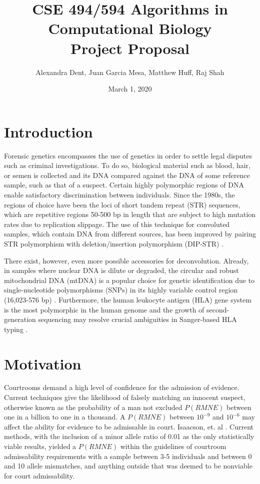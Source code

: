 \documentclass[10pt]{article}
\title{CSE 494/594 Algorithms in Computational Biology \\
		Project Proposal}
\author{Alexandra Dent, Juan Garcia Mesa, Matthew Huff, Raj Shah}
\date{March 1, 2020}
\begin{document}
\maketitle

\section{Introduction}
Forensic genetics encompasses the use of genetics in order to settle legal disputes such as criminal investigations. To do so, biological material such as blood, hair, or semen is collected and its DNA compared against the DNA of some reference sample, such as that of a suspect. Certain highly polymorphic regions of DNA enable satisfactory discrimination between individuals. Since the 1980s, the regions of choice have been the loci of short tandem repeat (STR) sequences, which are repetitive regions 50-500 bp in length that are subject to high mutation rates due to replication slippage. The use of this technique for convoluted samples, which contain DNA from different sources, has been improved by pairing STR polymorphism with deletion/insertion polymorphism (DIP-STR) \cite{Carracedo2000}.

There exist, however, even more possible accessories for deconvolution. Already, in samples where nuclear DNA is dilute or degraded, the circular and robust mitochondrial DNA (mtDNA) is a popular choice for genetic identification due to single-nucleotide polymorphisms (SNPs) in its highly variable control region (16,023-576 bp) \cite{Amorim2019, Lareu2000}. Furthermore, the human leukocyte antigen (HLA) gene system is the most polymorphic in the human genome and the growth of second-generation sequencing may resolve crucial ambiguities in Sanger-based HLA typing \cite{Kuffel2019}.

\section{Motivation}
Courtrooms demand a high level of confidence for the admission of evidence. Current techniques give the likelihood of falsely matching an innocent suspect, otherwise known as the probability of a man not excluded $P(RMNE)$ between one in a billion to one in a thousand.  A $P(RMNE)$ between $10^{-9}$ and $10^{-6}$ may affect the ability for evidence to be admissable in court. Isaacson, et. al \cite{Isaacson2014}. Current methods, with the inclusion of a minor allele ratio of 0.01 as the only statistically viable results, yielded a $P(RMNE)$ within the guidelines of courtroom admissability requirements with a sample between 3-5 individuals and between 0 and 10 allele mismatches, and anything outside that was deemed to be nonviable for court admissability.  
\end{document}

